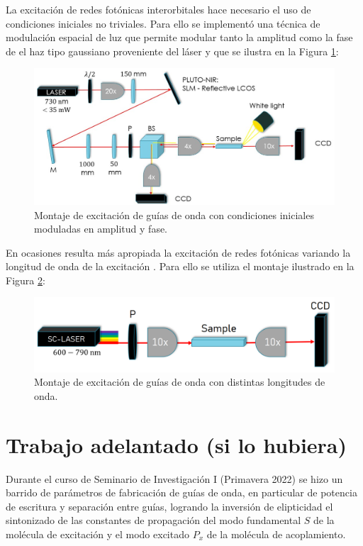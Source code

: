 \documentclass{article}
\begin{document}
La excitación de redes fotónicas interorbitales hace necesario el uso de condiciones iniciales no triviales. Para ello se implementó una técnica de modulación espacial de luz que permite modular tanto la amplitud como la fase de el haz tipo gaussiano proveniente del láser \cite{slm} y que se ilustra en la Figura \ref{fig:SLM}:

\begin{figure}[H]
	\centering
	\includegraphics[width=0.9\linewidth]{./media/SLMsetup.png}
	\caption{Montaje de excitación de guías de onda con condiciones iniciales moduladas en amplitud y fase.\label{fig:SLM}}
\end{figure}

En ocasiones resulta más apropiada la excitación de redes fotónicas variando la longitud de onda de la excitación \cite{spectraltransfer, SPSSH}. Para ello se utiliza el montaje ilustrado en la Figura \ref{fig:supercontinuum}:

\begin{figure}[H]
	\centering
	\includegraphics[width=0.7\linewidth]{./media/supercontinuum.png}
	\caption{Montaje de excitación de guías de onda con distintas longitudes de onda.\label{fig:supercontinuum}}
\end{figure}


\section{Trabajo adelantado (si lo hubiera)}

Durante el curso de Seminario de Investigación I (Primavera 2022) se hizo un barrido de parámetros de fabricación de guías de onda, en particular de potencia de escritura y separación entre guías, logrando la inversión de elipticidad el sintonizado de las constantes de propagación del modo fundamental $S$ de la molécula de excitación y el modo excitado $P_x$ de la molécula de acoplamiento.
\end{document}
